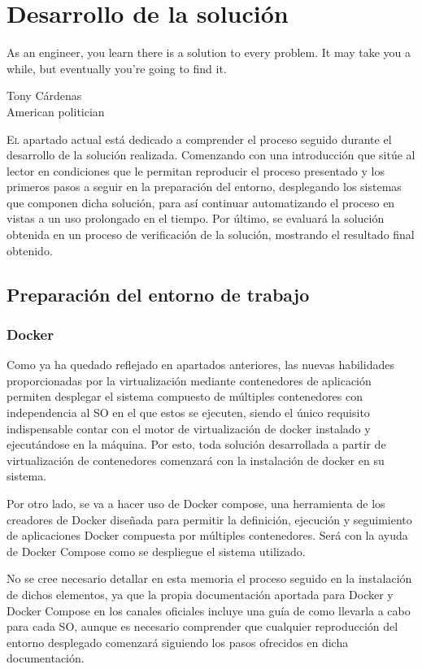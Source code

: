 \chapter{Desarrollo de la solución}\label{chp-04}
\epigraph{As an engineer, you learn there is a solution to every problem. It may take you a while, but eventually you're going to find it.}{Tony Cárdenas\\American politician}

\lettrine[lraise=-0.1, lines=2, loversize=0.2]{E}{l} apartado actual está dedicado a comprender el proceso seguido durante el desarrollo de la solución realizada. Comenzando con una introducción que sitúe al lector en condiciones que le permitan reproducir el proceso presentado y los primeros pasos a seguir en la preparación del entorno, desplegando los sistemas que componen dicha solución, para así continuar automatizando el proceso en vistas a un uso prolongado en el tiempo. Por último, se evaluará la solución obtenida en un proceso de verificación de la solución, mostrando el resultado final obtenido.

\section{Preparación del entorno de trabajo}\label{preparacion}

\subsection{Docker}
Como ya ha quedado reflejado en apartados anteriores, las nuevas habilidades proporcionadas por la virtualización mediante contenedores de aplicación permiten desplegar el sistema compuesto de múltiples contenedores con independencia al \gls{SO} en el que estos se ejecuten, siendo el único requisito indispensable contar con el motor de virtualización de docker instalado y ejecutándose en la máquina. Por esto, toda solución desarrollada a partir de virtualización de contenedores comenzará con la instalación de docker en su sistema.

Por otro lado, se va a hacer uso de Docker compose, una herramienta de los creadores de Docker diseñada para permitir la definición, ejecución y seguimiento de aplicaciones Docker compuesta por múltiples contenedores. Será con la ayuda de Docker Compose como se despliegue el sistema utilizado.

No se cree necesario detallar en esta memoria el proceso seguido en la instalación de dichos elementos, ya que la propia documentación aportada para Docker\cite{dockerinstallation2017} y Docker Compose\cite{dockercomposeinstallation2017} en los canales oficiales incluye una guía de como llevarla a cabo para cada \gls{SO}, aunque es necesario comprender que cualquier reproducción del entorno desplegado comenzará siguiendo los pasos ofrecidos en dicha documentación.

